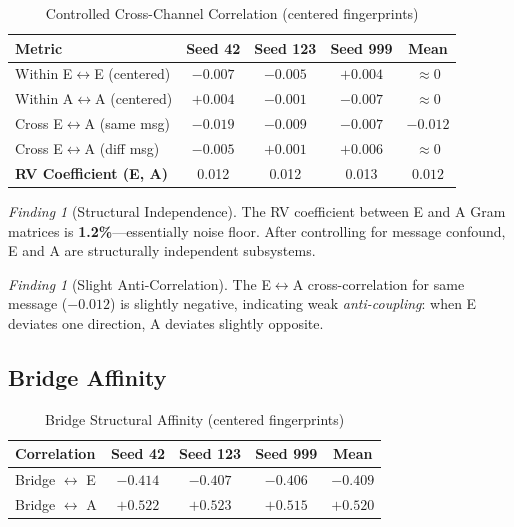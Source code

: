 \documentclass[11pt,a4paper]{article}
\theoremstyle{plain}
\theoremstyle{definition}
\theoremstyle{remark}
\newtheorem{finding}[theorem]{Finding}
\begin{document}
\begin{table}[h]
\centering
\caption{Controlled Cross-Channel Correlation (centered fingerprints)}
\label{tab:cross_channel}
\begin{tabular}{lcccc}
\toprule
Metric & Seed 42 & Seed 123 & Seed 999 & Mean \\
\midrule
Within E$\leftrightarrow$E (centered) & $-0.007$ & $-0.005$ & $+0.004$ & $\approx 0$ \\
Within A$\leftrightarrow$A (centered) & $+0.004$ & $-0.001$ & $-0.007$ & $\approx 0$ \\
\midrule
Cross E$\leftrightarrow$A (same msg) & $-0.019$ & $-0.009$ & $-0.007$ & $-0.012$ \\
Cross E$\leftrightarrow$A (diff msg) & $-0.005$ & $+0.001$ & $+0.006$ & $\approx 0$ \\
\midrule
\textbf{RV Coefficient (E, A)} & 0.012 & 0.012 & 0.013 & $\mathbf{0.012}$ \\
\bottomrule
\end{tabular}
\end{table}

\begin{finding}[Structural Independence]
The RV coefficient between E and A Gram matrices is \textbf{1.2\%}---essentially noise floor. After controlling for message confound, E and A are structurally independent subsystems.
\end{finding}

\begin{finding}[Slight Anti-Correlation]
The E$\leftrightarrow$A cross-correlation for same message ($-0.012$) is slightly negative, indicating weak \emph{anti-coupling}: when E deviates one direction, A deviates slightly opposite.
\end{finding}

\subsection{Bridge Affinity}

\begin{table}[h]
\centering
\caption{Bridge Structural Affinity (centered fingerprints)}
\label{tab:bridge_affinity}
\begin{tabular}{lcccc}
\toprule
Correlation & Seed 42 & Seed 123 & Seed 999 & Mean \\
\midrule
Bridge $\leftrightarrow$ E & $-0.414$ & $-0.407$ & $-0.406$ & $-0.409$ \\
Bridge $\leftrightarrow$ A & $+0.522$ & $+0.523$ & $+0.515$ & $+0.520$ \\
\bottomrule
\end{tabular}
\end{table}
\end{document}
